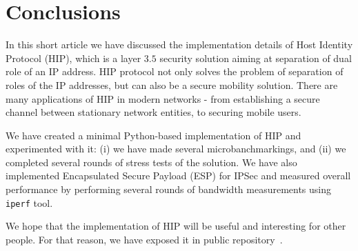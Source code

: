 \section{Conclusions}
\label{section:conclusion}

In this short article we have discussed the implementation 
details of Host Identity Protocol (HIP), which is a layer $3.5$ 
security solution aiming at separation of dual role of an IP
address. HIP protocol not only solves the problem of separation
of roles of the IP addresses, but can also be a secure mobility
solution. There are many applications of HIP in modern networks -
from establishing a secure channel between stationary network
entities, to securing mobile users.

We have created a minimal Python-based implementation of HIP and 
experimented with it: (i) we have made several microbanchmarkings, and (ii)
we completed several rounds of stress tests of the solution. 
We have also implemented Encapsulated Secure Payload (ESP) for IPSec and 
measured overall performance by performing several rounds of 
bandwidth measurements using \texttt{iperf} tool. 

We hope that the implementation of HIP will be useful and interesting
for other people. For that reason, we have exposed it in public 
repository~\cite{impl}.